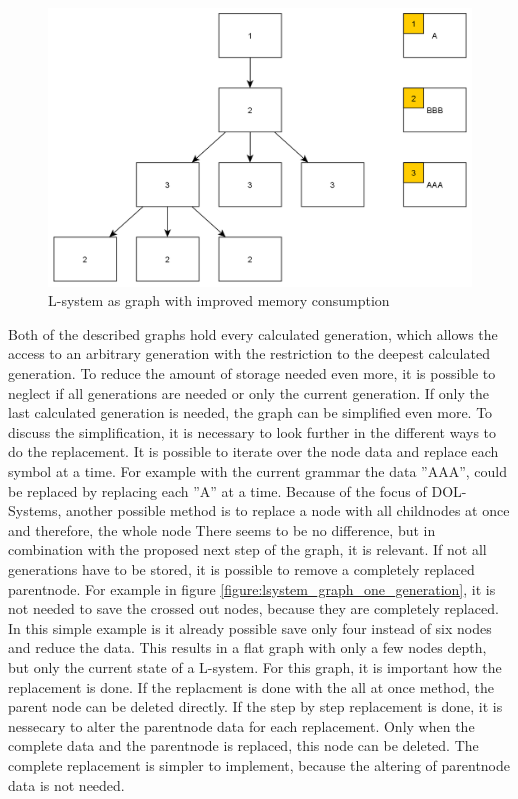\documentclass[english]{cpp-hmwk}
\begin{document}
\begin{figure}[h!]
	\centering
	\includegraphics[width=0.8\columnwidth]{../graphs/lsystem_graph_reduced_example.png}
	\caption{L-system as graph with improved memory consumption}
	\label{figure:lsystem_graph_mem_reduction}
\end{figure}

\medskip
\noindent Both of the described graphs hold every calculated generation, which allows the access to an arbitrary generation with the restriction to the deepest calculated generation. To reduce the amount of storage needed even more, it is possible to neglect if all generations are needed or only the current generation. If only the last calculated generation is needed, the graph can be simplified even more. To discuss the simplification, it is necessary to look further in the different ways to do the replacement. It  is possible to iterate over the node data and replace each symbol at a time. For example with the current grammar the data ''AAA'', could be replaced by replacing each ''A'' at a time. Because of the focus of DOL-Systems, another possible method is to replace a node with all childnodes at once and therefore, the whole node\newline
There seems to be no difference, but in combination with the proposed next step of the graph, it is relevant. If not all generations have to be stored, it is possible to remove a completely replaced parentnode. For example in figure \ref{figure:lsystem_graph_one_generation}, it is not needed to save the crossed out nodes, because they are completely replaced. In this simple example is it already possible save only four instead of six nodes and reduce the data. This results in a flat graph with only a few nodes depth, but only the current state of a L-system. For this graph, it is  important how the replacement is done. If the replacment is done with the all at once method, the parent node can be deleted directly. If the step by step replacement is done, it is nessecary to alter the parentnode data for each replacement. Only when the complete data and the parentnode is replaced, this node can be deleted. The complete replacement is simpler to implement, because the altering of parentnode data is not needed.
\end{document}
